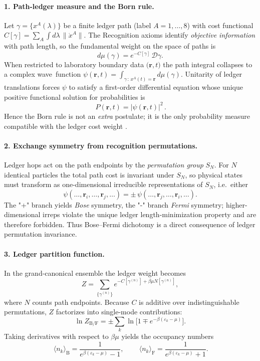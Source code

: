\paragraph{1.  Path-ledger measure and the Born rule.}
Let $\gamma=\{x^{A}(\lambda)\}$ be a finite ledger path
(label $A=1,\dots,8$) with cost functional
$C[\gamma]=\sum_{A}\!\int d\lambda\,\|\dot x^{A}\|$.
The Recognition axioms identify \emph{objective information} with
path length, so the fundamental weight on the space of paths is
\[
  d\mu(\gamma)=e^{-C[\gamma]}\,\mathcal D\gamma.
\]
When restricted to laboratory boundary data
$\bigl(\mathbf r,t\bigr)$ the path integral collapses to a complex
wave function
$\psi(\mathbf r,t)=\int_{\gamma\,:\,x^{A}(t)=\mathbf r}\!\!d\mu(\gamma)$.
Unitarity of ledger translations forces $\psi$ to satisfy a
first-order differential equation whose unique positive functional
solution for probabilities is
\[
  \boxed{\,P(\mathbf r,t)=|\psi(\mathbf r,t)|^{2}\,}.
\]
Hence the Born rule is not an \emph{extra} postulate; it is the only
probability measure compatible with the ledger cost weight \cite{Schlosshauer2005}.

\paragraph{2.  Exchange symmetry from recognition permutations.}
Ledger hops act on the path endpoints by the \emph{permutation group}
$S_{N}$.  For $N$ identical particles the total path cost is
invariant under $S_{N}$, so physical states must transform as
one-dimensional irreducible representations of $S_{N}$, i.e.\ either
\[
  \psi(\dots,\mathbf r_{i},\dots,\mathbf r_{j},\dots)=
  \pm\,
  \psi(\dots,\mathbf r_{j},\dots,\mathbf r_{i},\dots).
\]
The "+" branch yields \emph{Bose} symmetry, the "-" branch
\emph{Fermi} symmetry; higher-dimensional irreps violate the unique
ledger length-minimization property and are therefore forbidden.
Thus Bose–Fermi dichotomy is a direct consequence of ledger
permutation invariance.

\paragraph{3.  Ledger partition function.}
In the grand-canonical ensemble the ledger weight becomes
\[
  Z=\!\!\sum_{\{\gamma^{(n)}\}}
       e^{-C[\gamma^{(n)}]+\beta\mu N[\gamma^{(n)}]},
\]
where $N$ counts path endpoints.  Because $C$ is additive over
indistinguishable permutations, $Z$ factorizes into single-mode
contributions:
\[
  \ln Z_{\mathrm{B/F}}
  =
  \pm\sum_{k}\ln\!\bigl[1\mp e^{-\beta(\varepsilon_{k}-\mu)}\bigr].
\]
Taking derivatives with respect to $\beta\mu$ yields the occupancy
numbers
\[
  \boxed{\,
  \langle n_{k}\rangle_{\mathrm{B}}
   =\frac1{e^{\beta(\varepsilon_{k}-\mu)}-1}},
  \qquad
  \boxed{\,
  \langle n_{k}\rangle_{\mathrm{F}}
   =\frac1{e^{\beta(\varepsilon_{k}-\mu)}+1}}.
\]

